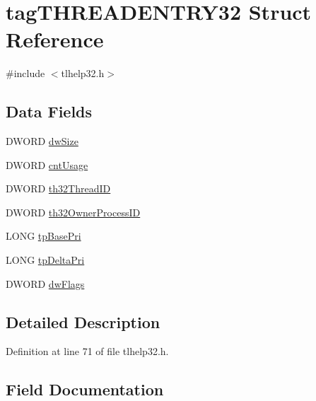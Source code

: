\hypertarget{structtag_t_h_r_e_a_d_e_n_t_r_y32}{}\section{tag\+T\+H\+R\+E\+A\+D\+E\+N\+T\+R\+Y32 Struct Reference}
\label{structtag_t_h_r_e_a_d_e_n_t_r_y32}


{\ttfamily \#include $<$tlhelp32.\+h$>$}

\subsection*{Data Fields}
\begin{DoxyCompactItemize}
\item 
D\+W\+O\+RD \hyperlink{structtag_t_h_r_e_a_d_e_n_t_r_y32_a669c5a85f5a9eb97e64ad880fadaaa2d}{dw\+Size}
\item 
D\+W\+O\+RD \hyperlink{structtag_t_h_r_e_a_d_e_n_t_r_y32_afd2d83c13a1e2ecb9f4878cd7a6d67bd}{cnt\+Usage}
\item 
D\+W\+O\+RD \hyperlink{structtag_t_h_r_e_a_d_e_n_t_r_y32_a478bf065c293e5e8c3ba92d9864f9bc0}{th32\+Thread\+ID}
\item 
D\+W\+O\+RD \hyperlink{structtag_t_h_r_e_a_d_e_n_t_r_y32_ac8de8c7efda602db975624e875533d56}{th32\+Owner\+Process\+ID}
\item 
L\+O\+NG \hyperlink{structtag_t_h_r_e_a_d_e_n_t_r_y32_ae1ec2b748649c85fa6e2ca7594e64e85}{tp\+Base\+Pri}
\item 
L\+O\+NG \hyperlink{structtag_t_h_r_e_a_d_e_n_t_r_y32_aed2c16d027dc0819aca2dad4d61deae8}{tp\+Delta\+Pri}
\item 
D\+W\+O\+RD \hyperlink{structtag_t_h_r_e_a_d_e_n_t_r_y32_a4d2f405b1141000eb2af256e0fc8b98b}{dw\+Flags}
\end{DoxyCompactItemize}


\subsection{Detailed Description}


Definition at line 71 of file tlhelp32.\+h.



\subsection{Field Documentation}
